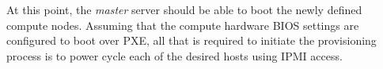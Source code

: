 At this point, the {\em master} server should be able to boot the newly defined
compute nodes. Assuming that the compute hardware BIOS settings are configured
to boot over PXE, all that is required to initiate the provisioning process is to power
cycle each of the desired hosts using IPMI access.
